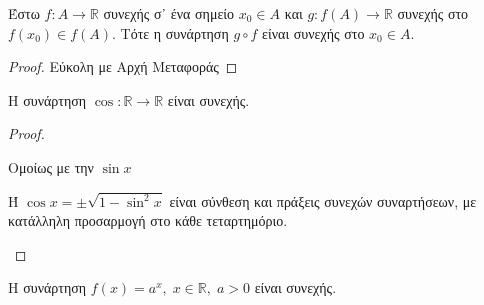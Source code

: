 \documentclass[a4paper,table]{report}
\begin{document}
\begin{prop}
  Έστω $ f \colon A \to \mathbb{R} $ συνεχής σ᾽ ένα σημείο $ x_{0} \in A $ 
  και $ g \colon f(A) \to \mathbb{R} $ συνεχής στο $ f(x_{0}) \in f(A) $. 
  Τότε η συνάρτηση $ g \circ f $ είναι συνεχής στο $ x_{0} \in A $.
\end{prop}

\begin{proof}
  Εύκολη με Αρχή Μεταφοράς
\end{proof}

\begin{prop}
  Η συνάρτηση $ \cos{} \colon \mathbb{R} \to \mathbb{R} $ είναι συνεχής.
\end{prop}

\begin{proof}
\item {}
  \begin{myitemize}
    \item Ομοίως με την $ \sin{x} $
    \item Ή $ \cos{x} = \pm \sqrt{1- \sin^{2}{x}} $ είναι σύνθεση και 
      πράξεις συνεχών συναρτήσεων, με κατάλληλη προσαρμογή στο 
      κάθε τεταρτημόριο.
  \end{myitemize}
\end{proof}

\begin{prop}
  Η συνάρτηση $ f(x) = a^{x}, \; x \in \mathbb{R}, \; a>0 $ είναι συνεχής.
\end{prop}
\end{document}
